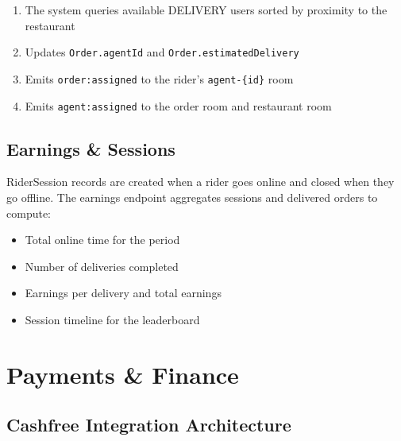 \documentclass[11pt,a4paper,twoside]{book}
\begin{document}
\begin{enumerate}[leftmargin=1.5em]
  \item The system queries available DELIVERY users sorted by proximity to the restaurant
  \item Updates \texttt{Order.agentId} and \texttt{Order.estimatedDelivery}
  \item Emits \texttt{order:assigned} to the rider's \texttt{agent-\{id\}} room
  \item Emits \texttt{agent:assigned} to the order room and restaurant room
\end{enumerate}

\section{Earnings \& Sessions}

RiderSession records are created when a rider goes online and closed when they
go offline.  The earnings endpoint aggregates sessions and delivered orders to
compute:

\begin{itemize}[leftmargin=1.4em,nosep]
  \item Total online time for the period
  \item Number of deliveries completed
  \item Earnings per delivery and total earnings
  \item Session timeline for the leaderboard
\end{itemize}

\chapter{Payments \& Finance}

\section{Cashfree Integration Architecture}
\end{document}
